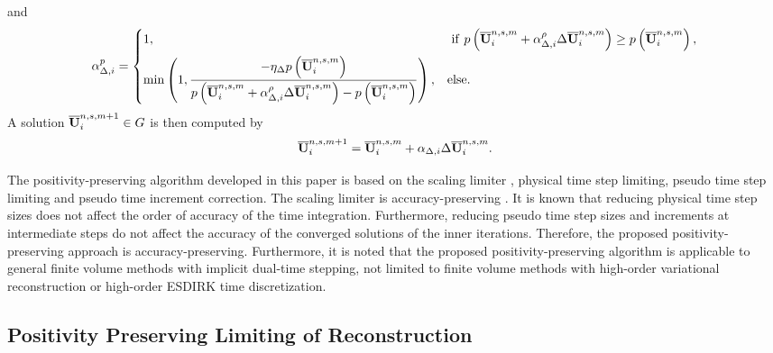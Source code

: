 and
\begin{equation}
    \alpha_{\mathrm\Delta,i}^{p} = \begin{dcases}
        1,                                                                                                                                                                              & \ \mathrm{if} \ p \left(\overline{\mathbf{U}}^{n,s,m}_i + \alpha_{\mathrm\Delta,i}^{\rho} \mathrm\Delta \overline{\mathbf{U}}_i^{n,s,m}\right) \geq  p \left(\overline{\mathbf{U}}^{n,s,m}_i\right), \\
        \min\left(1, \dfrac{-\eta_\mathrm\Delta p \left(\overline{\mathbf{U}}^{n,s,m}_i\right)}{p \left(\overline{\mathbf{U}}^{n,s,m}_i +  \alpha_{\mathrm\Delta,i}^{\rho} \mathrm\Delta \overline{\mathbf{U}}_i^{n,s,m}\right)-  p \left(\overline{\mathbf{U}}^{n,s,m}_i\right)} \right), &
        \mathrm{else}.
    \end{dcases}
\end{equation}
A solution $\overline{\mathbf{U}}^{n,s,m+1}_i \in G$ is then computed by
\begin{equation}
    \overline{\mathbf{U}}_i^{n,s,m+1} = \overline{\mathbf{U}}_i^{n,s,m} + \alpha_{\mathrm\Delta,i} \mathrm\Delta \overline{\mathbf{U}}_i^{n,s,m}.
\end{equation}


The positivity-preserving algorithm developed in this paper is based on the scaling limiter \cite{zhang2010positivity},
physical time step limiting,
pseudo time step limiting and pseudo time increment correction.
The scaling limiter is accuracy-preserving \cite{zhang2010positivity}.
It is known that reducing physical time step sizes does not affect the order of accuracy of the time integration.
Furthermore, reducing pseudo time step sizes and increments at intermediate steps do not affect the accuracy
of the converged solutions of the inner iterations.
Therefore, the proposed positivity-preserving approach is accuracy-preserving.
Furthermore, it is noted that the proposed positivity-preserving algorithm
is applicable to general finite volume methods with implicit dual-time stepping,
not limited to finite volume methods with high-order variational reconstruction or high-order ESDIRK time discretization.

\subsection{Positivity Preserving Limiting of Reconstruction}

